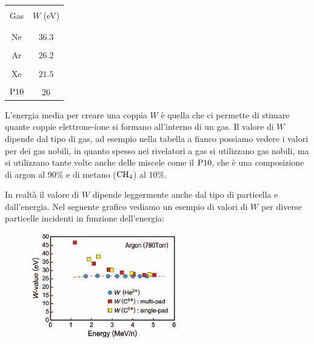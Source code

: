 \begin{minipage}{0.245\textwidth}
   \begin{center}
      \begin{tabular}{|c|c|}
         \hline
         &\\[-0.4cm]
         Gas & $W$ (eV)\\[0.1mm]
         &\\[-0.4cm]
         \hline
         &\\[-0.4cm]
         Ne & $36.3$\\[0.1mm]
         \hline
         &\\[-0.4cm]
         Ar & $26.2$\\[0.1mm]
         \hline
         &\\[-0.4cm]
         Xe & $21.5$\\[0.1mm]
         \hline
         &\\[-0.4cm]
         $\rm P10$ & $26$\\[0.1mm]
         \hline
      \end{tabular}
   \end{center}
\end{minipage}
\begin{minipage}{0.75\textwidth}
   L'energia media per creare una coppia $W$ è quella che ci permette di stimare quante coppie elettrone-ione si formano all'interno di un gas. Il valore di $W$ dipende dal tipo di gas, ad esempio nella tabella a fianco possiamo vedere i valori per dei gas nobili, in quanto spesso nei rivelatori a gas si utilizzano gas nobili, ma si utilizzano tante volte anche delle miscele come il $\rm P10$, che è una composizione di argon al 90\% e di metano ($\rm CH_4$) al 10\%.
\end{minipage}

\vspace{0.4cm}

In realtà il valore di $W$ dipende leggermente anche dal tipo di particella e dall'energia. Nel seguente grafico vediamo un esempio di valori di $W$ per diverse particelle incidenti in funzione dell'energia:

\begin{figure}[H]
   \centering
   \includegraphics[width=0.6\textwidth]{immagini/vallori_W_energia.png}
\end{figure}

